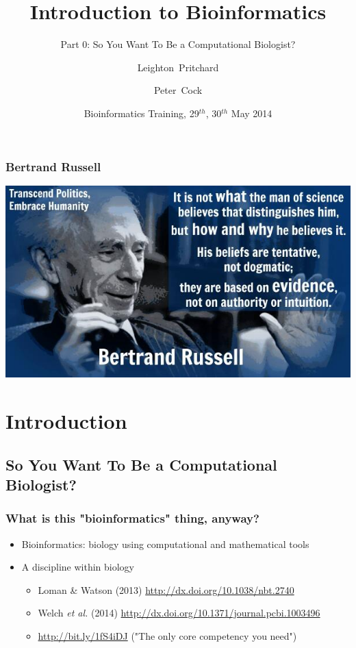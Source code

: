 \documentclass[table]{beamer}
\title[Intro to Bioinformatics] %
{Introduction to Bioinformatics}
\subtitle{Part 0: So You Want To Be a Computational Biologist?}
\author[Pritchard, Cock] %
{Leighton~Pritchard \and Peter~Cock}
\institute[The James Hutton Institute] %
{
  Information and Computational Sciences\\
  The James Hutton Institute
}
\date[May 2014] %
{Bioinformatics Training, 29$^{th}$, 30$^{th}$ May 2014}
\begin{document}
  \frame[plain]{\titlepage}
  
  \begin{frame}
    \frametitle{Bertrand Russell}
    \begin{center}
      \includegraphics[width=\textwidth]{images/bertrand}
    \end{center}
  \end{frame}
    
  \section{Introduction}
  \subsection{So You Want To Be a Computational Biologist?}
  \begin{frame}
    \frametitle{What is this "bioinformatics" thing, anyway?}
    \begin{itemize}
      \item Bioinformatics: biology using computational and mathematical tools
      \item A discipline within biology
      \begin{itemize}
        \item Loman \& Watson (2013) \url{http://dx.doi.org/10.1038/nbt.2740}
        \item Welch \textit{et al.} (2014) \url{http://dx.doi.org/10.1371/journal.pcbi.1003496}
        \item \url{http://bit.ly/1fS4iDJ} ("The only core competency you need")
      \end{itemize}
    \end{itemize}
  \end{frame}
\end{document}

